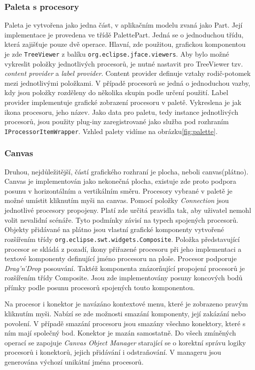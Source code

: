 \documentclass[ing,male,java,dept460]{diploma}		%
\begin{document}
\subsubsection{Paleta s procesory}
Paleta je vytvořena jako jedna část, v aplikačním modelu zvaná jako Part. Její implementace je provedena ve třídě PalettePart. Jedná se o jednoduchou třídu, která zajišťuje pouze dvě operace. Hlavní, zde použitou, grafickou komponentou je zde \texttt{TreeViewer} z balíku \texttt{org.eclipse.jface.viewers}. Aby bylo možné vykreslit položky jednotlivých procesorů, je nutné nastavit pro TreeViewer tzv. \textit{content provider} a \textit{label provider}. Content provider definuje vztahy rodič-potomek mezi jednotlivými položkami. V případě procesorů se jedná o jednoduchou vazby, kdy jsou položky rozděleny do několika skupin podle určení použití. Label provider implementuje grafické zobrazení procesoru v paletě. Vykreslena je jak ikona procesoru, jeho název. Jako data pro paletu, tedy instance jednotlivých procesorů, jsou použity plug-iny zaregistrované jako služba pod rozhraním \texttt{IProcessorItemWrapper}. Vzhled palety vidíme na obrázku\ref{fig:palette}.
\subsubsection{Canvas}
Druhou, nejdůležitější, částí grafického rozhraní je plocha, neboli canvas(plátno). Canvas je implementován jako nekonečná plocha, existuje zde proto podpora posunu v horizontálním a vertikálním směru. Procesory vybrané v paletě je možné umístit kliknutím myši na canvas. Pomocí položky \textit{Connection} jsou jednotlivé procesory propojeny. Platí zde určitá pravidla tak, aby uživatel nemohl volit nevalidní scénáře. Tyto podmínky závisí na typech spojených procesorů. Objekty přidávané na plátno jsou vlastní grafické komponenty vytvořené rozšířením třídy \texttt{org.eclipse.swt.widgets.Composite}. Položka představující procesor se skládá z pozadí, ikony přiřazené procesoru při jeho implementaci a textové komponenty definující jméno procesoru na ploše. Procesor podporuje \textit{Drag'n'Drop} posouvání. Taktéž komponenta znázorňující propojení procesorů je rozšířením třídy Composite. Jsou zde implementovány posuny koncových bodů přímky podle posunu procesorů spojených touto komponentou.
\par Na procesor i konektor je navázáno kontextové menu, které je zobrazeno pravým kliknutím myši. Nabízí se zde možnosti smazání komponenty, její zakázání nebo povolení. V případě smazání procesoru jsou smazány všechno konektory, které s ním mají společný bod. Konektor je mazán samostatně. Do všech zmíněných operací se zapojuje \textit{Canvas Object Manager} starající se o korektní správu logiky procesorů i konektorů, jejich přidávání i odstraňování. V manageru jsou generována výchozí unikátní jména procesorů.
\end{document}
